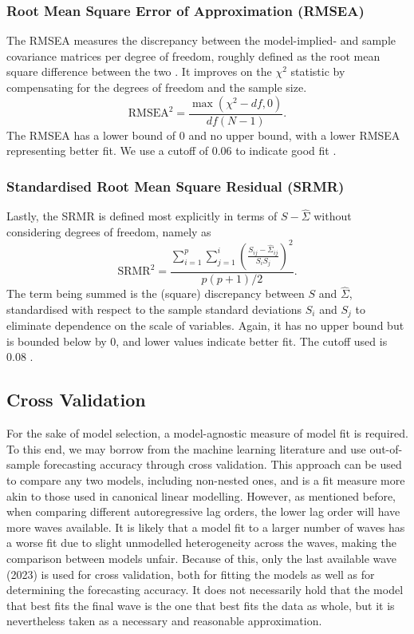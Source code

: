 \subsubsection{Root Mean Square Error of Approximation (RMSEA)}
The RMSEA measures the discrepancy between the model-implied- and sample covariance matrices per degree of freedom,
roughly defined as the root mean square difference between the two \cite{schermelleh2003evaluating}.
It improves on the $\chi^2$ statistic by compensating for the degrees of freedom and the sample size.
\begin{equation}
    \text{RMSEA}^2 = \frac{\max(\chi^2 - df, 0)}{df(N - 1)}.
\end{equation}
The RMSEA has a lower bound of 0 and no upper bound, with a lower RMSEA representing better fit.
We use a cutoff of 0.06 to indicate good fit \cite{hu1999cutoff}.

\subsubsection{Standardised Root Mean Square Residual (SRMR)}
Lastly, the SRMR is defined most explicitly in terms of $S - \hat{\Sigma}$ without considering degrees of freedom,
namely as \cite{schermelleh2003evaluating}
\begin{equation}
    \text{SRMR}^2 = \frac{\sum_{i=1}^p\sum_{j=1}^i (\frac{S_{ij} - \hat{\Sigma}_{ij}}{S_i S_j})^2}{p(p+1)/2}.
\end{equation}
The term being summed is the (square) discrepancy between $S$ and $\hat{\Sigma}$, standardised with respect to the sample standard
deviations $S_i$ and $S_j$ to eliminate dependence on the scale of variables.
Again, it has no upper bound but is bounded below by 0, and lower values indicate better fit.
The cutoff used is 0.08 \cite{hu1999cutoff}.

\subsection{Cross Validation}
\label{sec:methods:cv}
For the sake of model selection, a model-agnostic measure of model fit is required. To this end, we may borrow from the
machine learning literature and use out-of-sample forecasting accuracy through cross validation.
This approach can be used to compare any two models, including non-nested ones, and is a fit measure more akin to those
used in canonical linear modelling.
However, as mentioned before, when comparing different autoregressive lag orders, the lower lag order will have
more waves available. It is likely that a model fit to a larger number of waves has a worse fit due to slight
unmodelled heterogeneity across the waves, making the comparison between models unfair. Because of this, only the last
available wave (2023) is used for cross validation, both for fitting the models as well as for determining the forecasting
accuracy. It does not necessarily hold that the model that best fits the final wave is the one that best fits
the data as whole, but it is nevertheless taken as a necessary and reasonable approximation.

